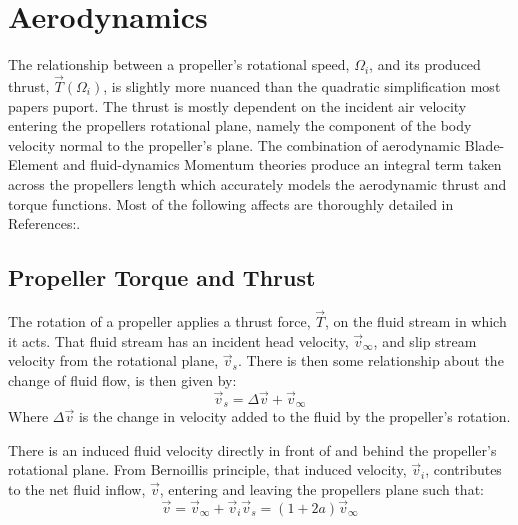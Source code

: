 \section{Aerodynamics}
\label{sec:dynamics.aero}
The relationship between a propeller's rotational speed, $\Omega_i$, and its produced thrust, $\vec{T}(\Omega_i)$, is slightly more nuanced than the quadratic simplification most papers puport. The thrust is mostly dependent on the incident air velocity entering the propellers rotational plane, namely the component of the body velocity normal to the propeller's plane. The combination of aerodynamic Blade-Element\cite{.} and fluid-dynamics Momentum\cite{.} theories produce an integral term taken across the propellers length which accurately models the aerodynamic thrust and torque functions. Most of the following affects are thoroughly detailed in References:\cite{.,.,.}.
\subsection{Propeller Torque and Thrust}
\label{subsec:dynamics.aero.bem}
The rotation of a propeller applies a thrust force, $\vec{T}$, on the fluid stream in which it acts. That fluid stream has an incident head velocity, $\vec{v}_\infty$, and slip stream velocity from the rotational plane, $\vec{v}_s$. There is then some relationship about the change of fluid flow, is then given by:
\begin{equation}
\vec{v}_s=\Delta \vec{v} + \vec{v}_\infty
\end{equation}
Where $\Delta \vec{v}$ is the change in velocity added to the fluid by the propeller's rotation. 
\par
\par

There is an induced fluid velocity directly in front of and behind the propeller's rotational plane. From Bernoillis principle, that induced velocity, $\vec{v}_i$, contributes to the net fluid inflow, $\vec{v}$, entering and leaving the propellers plane such that:
\begin{subequations}
\begin{equation}
\vec{v}=\vec{v}_\infty+\vec{v}_i
\end{equation}
\begin{equation}
\vec{v}_s=(1+2a)\vec{v}_\infty
\end{equation}
\end{subequations}
\par



